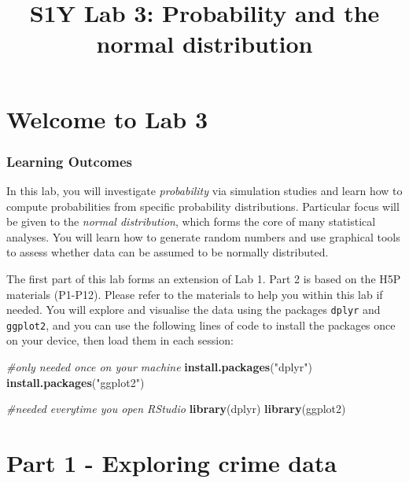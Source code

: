 \documentclass[
]{book}
\title{S1Y Lab 3: Probability and the normal distribution}
\author{}
\date{\vspace{-2.5em}}
\newenvironment{Shaded}{\begin{snugshade}}{\end{snugshade}}
\newcommand{\CommentTok}[1]{\textcolor[rgb]{0.56,0.35,0.01}{\textit{#1}}}
\newcommand{\FunctionTok}[1]{\textcolor[rgb]{0.13,0.29,0.53}{\textbf{#1}}}
\newcommand{\NormalTok}[1]{#1}
\newcommand{\StringTok}[1]{\textcolor[rgb]{0.31,0.60,0.02}{#1}}
\begin{document}
\maketitle

{
\setcounter{tocdepth}{1}
\tableofcontents
}
\hypertarget{welcome-to-lab-3}{%
\chapter{Welcome to Lab 3}\label{welcome-to-lab-3}}

\hypertarget{learning-outcomes}{%
\subsection{Learning Outcomes}\label{learning-outcomes}}

In this lab, you will investigate \emph{probability} via simulation studies and learn how to compute probabilities from specific probability distributions. Particular focus will be given to the \emph{normal distribution}, which forms the core of many statistical analyses. You will learn how to generate random numbers and use graphical tools to assess whether data can be assumed to be normally distributed.

The first part of this lab forms an extension of Lab 1. Part 2 is based on the H5P materials (P1-P12). Please refer to the materials to help you within this lab if needed.
You will explore and visualise the data using the packages \texttt{dplyr} and \texttt{ggplot2}, and you can use the following lines of code to install the packages once on your device, then load them in each session:

\begin{Shaded}
\begin{Highlighting}[]
\CommentTok{\#only needed once on your machine}
\FunctionTok{install.packages}\NormalTok{(}\StringTok{"dplyr"}\NormalTok{) }
\FunctionTok{install.packages}\NormalTok{(}\StringTok{"ggplot2"}\NormalTok{)}

\CommentTok{\#needed everytime you open RStudio}
\FunctionTok{library}\NormalTok{(dplyr)}
\FunctionTok{library}\NormalTok{(ggplot2)}
\end{Highlighting}
\end{Shaded}

\hypertarget{part-1---exploring-crime-data}{%
\chapter{Part 1 - Exploring crime data}\label{part-1---exploring-crime-data}}
\end{document}
